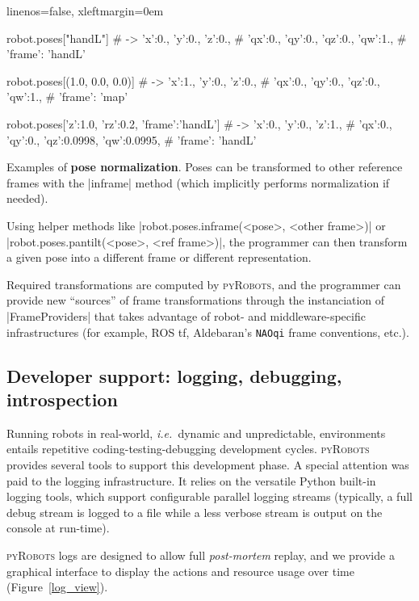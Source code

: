 \documentclass[a4paper, 10pt, conference]{ieeeconf}      %
\newcommand{\ie}{{\textit{i.e.\ }}}
\newcommand{\pyRobots}{\textsc{pyRobots}}
\begin{document}
\begin{listing}[H]
    \begin{pythoncode*}{linenos=false, xleftmargin=0em}

    robot.poses["handL"]
    # -> {'x':0., 'y':0., 'z':0., 
    #    'qx':0., 'qy':0., 'qz':0., 'qw':1., 
    #    'frame': 'handL'}

    robot.poses[(1.0, 0.0, 0.0)]
    # -> {'x':1., 'y':0., 'z':0., 
    #    'qx':0., 'qy':0., 'qz':0., 'qw':1., 
    #    'frame': 'map'}

    robot.poses[{'z':1.0, 'rz':0.2, 'frame':'handL'}]
    # -> {'x':0., 'y':0., 'z':1., 
    #    'qx':0., 'qy':0., 'qz':0.0998, 'qw':0.0995, 
    #    'frame': 'handL'}

\end{pythoncode*}
\caption{Examples of \textbf{pose normalization}. Poses can be transformed to
other reference frames with the \python|inframe| method (which implicitly performs
normalization if needed).}
\label{lst:poses}
\end{listing}

Using helper methods like \python|robot.poses.inframe(<pose>, <other frame>)| or
\python|robot.poses.pantilt(<pose>, <ref frame>)|, the programmer can then
transform a given pose into a different frame or different representation.

Required transformations are computed by \pyRobots{}, and the programmer can
provide new ``sources'' of frame transformations through the instanciation of
\python|FrameProviders| that takes advantage of robot- and middleware-specific
infrastructures (for example, ROS {\sc tf}, Aldebaran's {\tt NAOqi} frame
conventions, etc.).

\subsection{Developer support: logging, debugging, introspection}
\label{}

Running robots in real-world, \ie dynamic and unpredictable, environments
entails repetitive coding-testing-debugging development cycles. \pyRobots{}
provides several tools to support this development phase. A special attention
was paid to the logging infrastructure. It relies on the versatile Python
built-in logging tools, which support configurable parallel logging streams
(typically, a full debug stream is logged to a file while a less verbose stream
is output on the console at run-time).

\pyRobots{} logs are designed to allow full \emph{post-mortem} replay, and we
provide a graphical interface to display the actions and resource usage over
time (Figure~\ref{log_view}).
\end{document}
